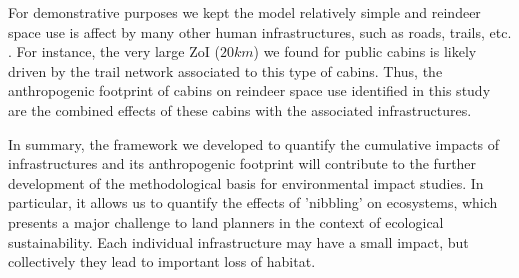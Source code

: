 \documentclass{article}
\begin{document}
For demonstrative purposes we kept the model relatively simple and reindeer space use is affect by many other human infrastructures, such as roads, trails, etc. \citep[e.g.][]{panzacchi2015searching}. For instance, the very large ZoI ($20 km$) we found for public cabins is likely driven by the trail network associated to this type of cabins. Thus, the anthropogenic footprint of cabins on reindeer space use identified in this study are the combined effects of these cabins with the associated infrastructures. 

In summary, the framework we developed to quantify the cumulative impacts of infrastructures and its anthropogenic footprint will contribute to the further development of the methodological basis for environmental impact studies. In particular, it allows us to quantify the effects of 'nibbling' on ecosystems, which presents a major challenge to land planners in the context of ecological sustainability. Each individual infrastructure may have a small impact, but collectively they lead to important loss of habitat.





\end{document}
